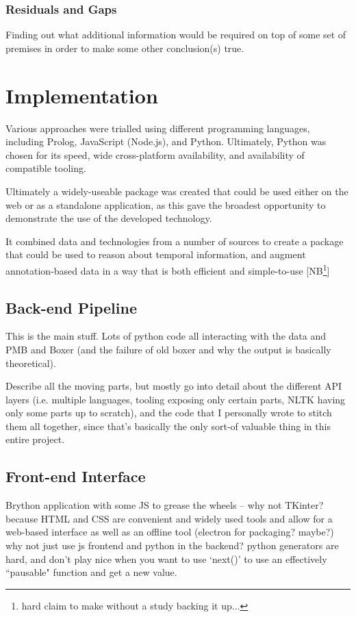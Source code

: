 \documentclass[a4paper,12pt,leqno]{article}
\newcommand{\selfnote}[1]{{\color{red}[NB\footnote{{\color{red}#1}}]}}
\newcommand{\nb}{\selfnote}
\begin{document}
\subsubsection{Residuals and Gaps}\label{ssub:residuals}
Finding out what additional information would be required on top of some set of premises in order to make some other conclusion(s) true.

\newpage
\section{Implementation}\label{sec:implementation}
Various approaches were trialled using different programming languages, including Prolog, JavaScript (Node.js), and Python. Ultimately, Python was chosen for its speed, wide cross-platform availability, and availability of compatible tooling.

Ultimately a widely-useable package was created that could be used either on the web or as a standalone application, as this gave the broadest opportunity to demonstrate the use of the developed technology.

It combined data and technologies from a number of sources to create a package that could be used to reason about temporal information, and augment annotation-based data in a way that is both efficient and simple-to-use \nb{hard claim to make without a study backing it up...}

\subsection{Back-end Pipeline}\label{sub:backend} %
This is the main stuff. Lots of python code all interacting with the data and PMB and Boxer (and the failure of old boxer and why the output is basically theoretical).

Describe all the moving parts, but mostly go into detail about the different API layers (i.e. multiple languages, tooling exposing only certain parts, NLTK having only some parts up to scratch), and the code that I personally wrote to stitch them all together, since that's basically the only sort-of valuable thing in this entire project.

\subsection{Front-end Interface}\label{sub:frontend}
Brython application with some JS to grease the wheels -- why not TKinter? because HTML and CSS are convenient and widely used tools and allow for a web-based interface as well as an offline tool (electron for packaging? maybe?) why not just use js frontend and python in the backend? python generators are hard, and don't play nice when you want to use `next()' to use an effectively ``pausable" function and get a new value.
\end{document}
